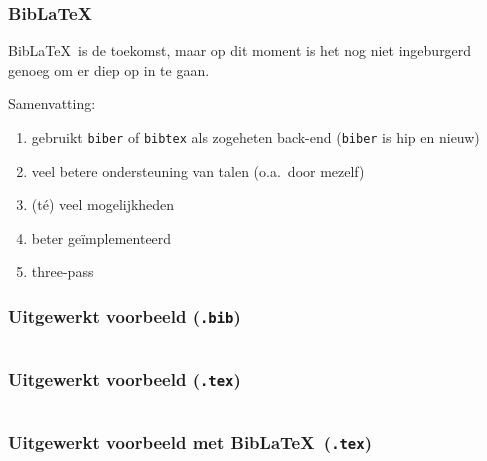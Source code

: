 \begin{frame}[fragile]
  \frametitle{Bib\LaTeX}

  Bib\LaTeX\ is de toekomst, maar op dit moment is het nog niet ingeburgerd genoeg om er diep op in te gaan.

  Samenvatting:
  \begin{enumerate}
    \item gebruikt \verb|biber| of \verb|bibtex| als zogeheten back-end (\verb|biber| is hip en nieuw)
    \item veel betere ondersteuning van talen (o.a.\ door mezelf) 
    \item (t\'e) veel mogelijkheden
    \item beter ge\"implementeerd
    \item three-pass
  \end{enumerate}
\end{frame}

\begin{frame}[fragile]
  \frametitle{Uitgewerkt voorbeeld (\texttt{.bib})}

  \inputminted{tex}{bib-example.bib}
\end{frame}

\begin{frame}[fragile]
  \frametitle{Uitgewerkt voorbeeld (\texttt{.tex})}

  \scriptsize
  \inputminted{tex}{bib-example.tex}
\end{frame}

\begin{frame}[fragile]
  \frametitle{Uitgewerkt voorbeeld met Bib\LaTeX\ (\texttt{.tex})}

  \scriptsize
  \inputminted{tex}{bib-example-biblatex.tex}
\end{frame}

%
%
%
%
